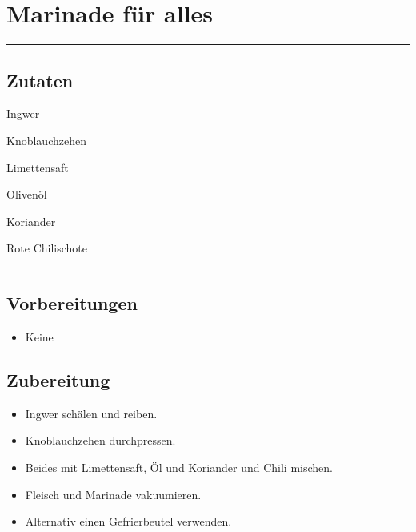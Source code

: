 \section*{Marinade für alles}

\bigbreak
\rule{\textwidth}{0.4pt}

\subsection*{Zutaten}

\begin{description}[align=right,leftmargin=!,labelwidth=\widthof{\bfseries xxPrisen}]
    \item[25g] Ingwer
    \item[2] Knoblauchzehen
    \item[4 EL] Limettensaft
    \item[4 EL] Olivenöl
    \item[1 Bund] Koriander
    \item[1] Rote Chilischote
\end{description}


\rule{\textwidth}{0.4pt}


\subsection*{Vorbereitungen}

\begin{itemize}
    \item Keine
\end{itemize}


\bigbreak
\subsection*{Zubereitung}

\begin{itemize}
    \item Ingwer schälen und reiben.
    \item Knoblauchzehen durchpressen.
    \item Beides mit Limettensaft, Öl und Koriander und Chili mischen.
    \item Fleisch und Marinade vakuumieren.
    \item Alternativ einen Gefrierbeutel verwenden.
\end{itemize}
